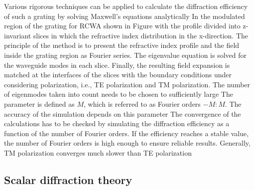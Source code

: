 Various rigorous techniques can be applied to calculate the diffraction efficiency of such a grating by solving Maxwell’s equations analytically%
In the modulated region of the grating for RCWA shown in Figure with the profile divided into z-invariant slices in which the refractive index distribution in the x-direction.
The principle of the method is to present the refractive index profile and the field inside the grating region as Fourier series.
The eigenvalue equation is solved for the waveguide modes in each slice.
Finally, the resulting field expansion is matched at the interfaces of the slices with the boundary conditions under considering polarization, i.e., TE polarization and TM polarization.
The number of eigenmodes taken into count needs to be chosen to sufficiently large%
The parameter is defined as $M$, which is referred to as Fourier orders $-M:M$. The accuracy of the simulation depends on this parameter%
The convergence of the calculations has to be checked by simulating the diffraction efficiency as a function of the number of Fourier orders. If the efficiency reaches a stable value, the number of Fourier orders is high enough to ensure reliable results.
Generally, TM polarization converges much slower than TE polarization%


\subsection{Scalar diffraction theory}

